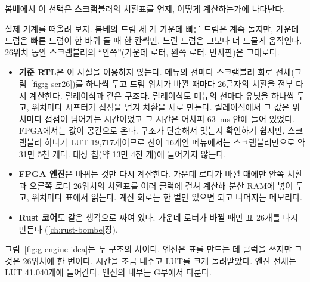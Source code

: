 \Ours 봄베에서 이 선택은 스크램블러의 치환표를 언제, 어떻게 계산하는가에 나타난다.

실제 기계를 떠올려 보자. 봄베의 드럼 세 개 가운데 빠른 드럼은 계속 돌지만, 가운데 드럼은 빠른 드럼이 한 바퀴
돌 때 한 칸씩만, 느린 드럼은 그보다 더 드물게 움직인다. 26위치 동안 스크램블러의 ``안쪽''(가운데 로터, 왼쪽 로터, 반사판)은 그대로다.

\begin{itemize}
\item \textbf{기준 RTL}은 이 사실을 이용하지 않는다. 메뉴의 선마다 스크램블러 회로 전체(그림~\ref{fig:g-scr26})를
하나씩 두고 드럼 위치가 바뀔 때마다 26글자의 치환을 전부 다시 계산한다. 릴레이식과 같은 구조다. 릴레이식도
메뉴의 선마다 유닛을 하나씩 두고, 위치마다 시프터가 접점을 넘겨 치환을 새로 만든다. 릴레이식에서 그 값은
위치마다 접점이 넘어가는 시간이었고 그 시간은 어차피 63~ms 안에 들어 있었다. FPGA에서는 값이 공간으로 온다.
구조가 단순해서 맞는지 확인하기 쉽지만, 스크램블러 하나가 LUT 19,717개이므로 선이 16개인 메뉴에서는
스크램블러만으로 약 31만 5천 개다. 대상 칩(약 13만 4천 개)에 들어가지 않는다.
\item \textbf{FPGA 엔진}은 바뀌는 것만 다시 계산한다. 가운데 로터가 바뀔 때에만 안쪽 치환과 오른쪽 로터
26위치의 치환표를 여러 클럭에 걸쳐 계산해 분산 RAM에 넣어 두고, 위치마다 표에서 읽는다. 계산 회로는 한
벌만 있으면 되고 나머지는 메모리다.
\item \textbf{Rust 코어}도 같은 생각으로 짜여 있다. 가운데 로터가 바뀔 때만 표 26개를 다시 만든다
(\ref{ch:rust-bombe}장).
\end{itemize}

그림~\ref{fig:g-engine-idea}는 두 구조의 차이다. 엔진은 표를 만드는 데 클럭을 쓰지만 그것은 26위치에 한
번이다. 시간을 조금 내주고 LUT를 크게 돌려받았다. 엔진 전체는 LUT 41,040개에 들어간다. 엔진의 내부는
G부에서 다룬다.


